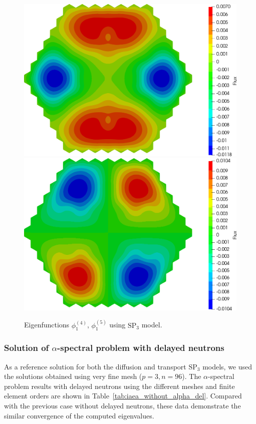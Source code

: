 \documentclass[authoryear]{elsarticle}
\begin{document}
\begin{figure}[H]
\begin{center}
	\includegraphics[width=0.49\linewidth]{iaea_without/alpha_sp3_u1_4_without.png}
	\includegraphics[width=0.49\linewidth]{iaea_without/alpha_sp3_u1_5_without.png}\\
	\caption{Eigenfunctions $\phi_1^{(4)}$, $\phi_1^{(5)}$ using $\mathrm{SP_3}$ model.}
	\label{fig:iaea_without_fun_3}
\end{center}
\end{figure}

\subsubsection{Solution of $\alpha$-spectral problem with delayed neutrons}

As a reference solution for both the diffusion and transport $\mathrm{SP_3}$ models, we used the solutions obtained using very fine mesh ($p = 3, n = 96$). 
The  $\alpha$-spectral problem results with delayed neutrons using the different meshes and finite element orders are shown in Table~\ref{tab:iaea_without_alpha_del}.
Compared with the previous case without delayed neutrons, these data demonstrate the similar convergence of the computed eigenvalues.
\end{document}
